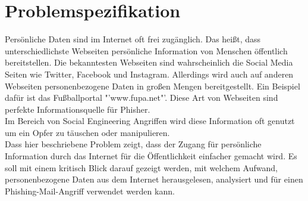 

\chapter{Problemspezifikation}  %
\label{cha:Problemspezifikation} %
Persönliche Daten sind im Internet oft frei zugänglich. Das heißt, dass unterschiedlichste Webseiten persönliche Information von Menschen öffentlich bereitstellen. Die bekanntesten Webseiten sind wahrscheinlich die Social Media Seiten wie Twitter, Facebook und Instagram. Allerdings wird auch auf anderen Webseiten personenbezogene Daten in großen Mengen bereitgestellt. Ein Beispiel dafür ist das Fußballportal "'www.fupa.net"'. Diese Art von Webseiten sind perfekte Informationsquelle für Phisher.\\
Im Bereich von Social Engineering Angriffen wird diese Information oft genutzt um ein Opfer zu täuschen oder manipulieren.\\
Dass hier beschriebene Problem zeigt, dass der Zugang für persönliche Information durch das Internet für die Öffentlichkeit einfacher gemacht wird. Es soll mit einem kritisch Blick darauf gezeigt werden, mit welchem Aufwand, personenbezogene Daten aus dem Internet herausgelesen, analysiert und für einen Phishing-Mail-Angriff verwendet werden kann.
